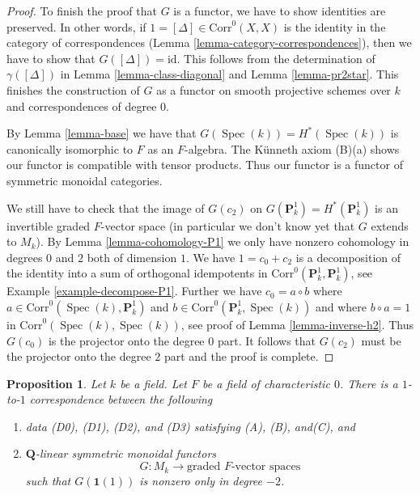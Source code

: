 \documentclass{stacks-project}
\theoremstyle{plain}
\newtheorem{proposition}[subsection]{Proposition}
\theoremstyle{definition}
\theoremstyle{remark}
\numberwithin{equation}{subsection}
\def\Spec{\mathop{\mathrm{Spec}}}
\begin{document}
\begin{proof}
\medskip\noindent
To finish the proof that $G$ is a functor,
we have to show identities are preserved. In other words, if
$1 = [\Delta] \in \text{Corr}^0(X, X)$ is the identity in the category
of correspondences (Lemma \ref{lemma-category-correspondences}),
then we have to show that $G([\Delta]) = \text{id}$.
This follows from the determination
of $\gamma([\Delta])$ in Lemma \ref{lemma-class-diagonal}
and Lemma \ref{lemma-pr2star}.
This finishes the construction of $G$ as a functor on
smooth projective schemes over $k$ and correspondences of degree $0$.

\medskip\noindent
By Lemma \ref{lemma-base} we have that
$G(\Spec(k)) = H^*(\Spec(k))$ is canonically isomorphic to $F$
as an $F$-algebra. The K\"unneth axiom (B)(a)
shows our functor is compatible with tensor products.
Thus our functor is a functor of symmetric monoidal categories.

\medskip\noindent
We still have to check that the image of $G(c_2)$ on
$G(\mathbf{P}^1_k) = H^*(\mathbf{P}^1_k)$
is an invertible graded $F$-vector space (in particular we don't know yet
that $G$ extends to $M_k$). By Lemma \ref{lemma-cohomology-P1}
we only have nonzero cohomology in degrees $0$ and $2$
both of dimension $1$. We have $1 = c_0 + c_2$ is a decomposition
of the identity into a sum of orthogonal idempotents in
$\text{Corr}^0(\mathbf{P}^1_k, \mathbf{P}^1_k)$, see
Example \ref{example-decompose-P1}. Further we have $c_0 = a \circ b$ where
$a \in \text{Corr}^0(\Spec(k), \mathbf{P}^1_k)$ and
$b \in \text{Corr}^0(\mathbf{P}^1_k, \Spec(k))$ and where
$b \circ a = 1$ in $\text{Corr}^0(\Spec(k), \Spec(k))$, see proof of
Lemma \ref{lemma-inverse-h2}. Thus $G(c_0)$ is the projector
onto the degree $0$ part. It follows that $G(c_2)$ must
be the projector onto the degree $2$ part and the proof is complete.
\end{proof}

\begin{proposition}
\label{proposition-weil-cohomology-theory}
Let $k$ be a field. Let $F$ be a field of characteristic $0$. There is a
$1$-to-$1$ correspondence between the following
\begin{enumerate}
\item data (D0), (D1), (D2), and (D3) satisfying (A), (B), and(C), and
\item $\mathbf{Q}$-linear symmetric monoidal functors
$$
G : M_k \longrightarrow \text{graded }F\text{-vector spaces}
$$
such that $G(\mathbf{1}(1))$ is nonzero only in degree $-2$.
\end{enumerate}
\end{proposition}
\end{document}
